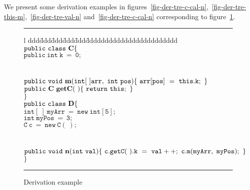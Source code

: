 \documentclass[a4paper]{llncs}
\begin{document}
We present some derivation examples in
figures~\ref{fig-der-tre-c-cal-n},~\ref{fig-der-tre-this-m},~\ref{fig-der-tre-val-n}
and~\ref{fig-der-tre-c-cal-n} corresponding to
figure~\ref{fig-der-exa}.
\begin{figure}[htb]
\rule{\linewidth}{0.25mm}
\rule{0em}{0.1ex}
\begin{tabbing}{l}
ddd\=ddd\=ddd\=ddd\=ddd\=dddddddddddddddddddddddd \kill
\>$\mathtt{public\ class\ {\bf C}\{}$ \\
\>\>$\mathtt{public\ int\ k\ =\ 0;}$ \\
\\
\> \\
\>\>$\mathtt{public\ void\ {\bf m}(int[\ ] arr,\ int\ pos)\{\ arr[pos]\ =\
this.k;\ \}}$ \\
\>\>$\mathtt{public\ {\bf C}\ {\bf getC}(\ )\{\ return\ this;\ \}}$ \\
\>$\mathtt{\}}$ \\
\>$\mathtt{public\ class\ {\bf D}\{}$ \\
\>\>$\mathtt{int[\ ]\ myArr\ =\ new\ int[5];}$ \\
\>\>$\mathtt{int\ myPos\ =\ 3;}$ \\
\>\>$\mathtt{C\ c\ =\ new\ C(\ );}$ \\
\\
\> \\
\>\>$\mathtt{public\ void\ {\bf n}(int\ val)\{\ c.getC(\ ).k\ =\
val++;\ c.m(myArr,\ myPos);\ \}}$ \\
\>$\mathtt{\}}$
\end{tabbing}
\caption{Derivation example}
\label{fig-der-exa}
\rule{\linewidth}{0.25mm}
\end{figure} %
\end{document}
